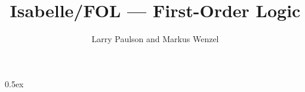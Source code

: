 \documentclass[11pt,a4paper]{article}
\begin{document}
\title{Isabelle/FOL --- First-Order Logic}
\author{Larry Paulson and Markus Wenzel}
\maketitle

\tableofcontents

\parindent 0pt\parskip 0.5ex

\end{document}
